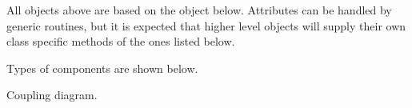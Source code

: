 All objects above are based on the object below.  Attributes
can be handled by generic routines, but it is expected that 
higher level objects will supply their own class specific
methods of the ones listed below.


Types of components are shown below.


Coupling diagram.


